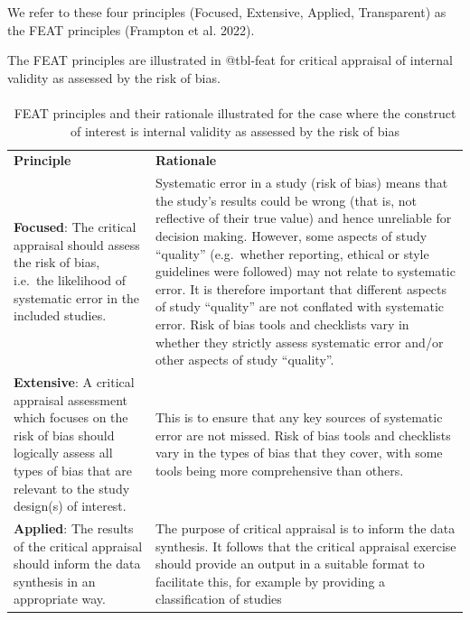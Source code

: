 \documentclass[
  letterpaper,
  DIV=11,
  numbers=noendperiod]{scrreprt}
\makeatletter
\let\oldparagraph\paragraph
\renewcommand{\paragraph}{
    \@ifstar
      \xxxParagraphStar
      \xxxParagraphNoStar
  }
\newcommand{\xxxParagraphStar}[1]{\oldparagraph*{#1}\mbox{}}
\newcommand{\xxxParagraphNoStar}[1]{\oldparagraph{#1}\mbox{}}
\makeatother
\begin{document}
We refer to these four principles (Focused, Extensive, Applied,
Transparent) as the FEAT principles (Frampton et al. 2022).

The FEAT principles are illustrated in @tbl-feat for critical appraisal
of internal validity as assessed by the risk of bias.

\paragraph{}\label{section}

\begin{longtable}[]{@{}
  >{\raggedright\arraybackslash}p{}
  >{\raggedright\arraybackslash}p{}@{}}
\caption{FEAT principles and their rationale illustrated for the case
where the construct of interest is internal validity as assessed by the
risk of bias}\label{tbl-feat}\tabularnewline
\toprule\noalign{}
\endfirsthead
\endhead
\bottomrule\noalign{}
\endlastfoot
\textbf{Principle} & \textbf{Rationale} \\
\textbf{Focused}: The critical appraisal should assess the risk of bias,
i.e.~the likelihood of systematic error in the included studies. &
Systematic error in a study (risk of bias) means that the study's
results could be wrong (that is, not reflective of their true value) and
hence unreliable for decision making. However, some aspects of study
``quality'' (e.g.~whether reporting, ethical or style guidelines were
followed) may not relate to systematic error. It is therefore important
that different aspects of study ``quality'' are not conflated with
systematic error. Risk of bias tools and checklists vary in whether they
strictly assess systematic error and/or other aspects of study
``quality''. \\
\textbf{Extensive}: A critical appraisal assessment which focuses on the
risk of bias should logically assess all types of bias that are relevant
to the study design(s) of interest. & This is to ensure that any key
sources of systematic error are not missed. Risk of bias tools and
checklists vary in the types of bias that they cover, with some tools
being more comprehensive than others. \\
\textbf{Applied}: The results of the critical appraisal should inform
the data synthesis in an appropriate way. & The purpose of critical
appraisal is to inform the data synthesis. It follows that the critical
appraisal exercise should provide an output in a suitable format to
facilitate this, for example by providing a classification of studies

\end{longtable}
\end{document}
